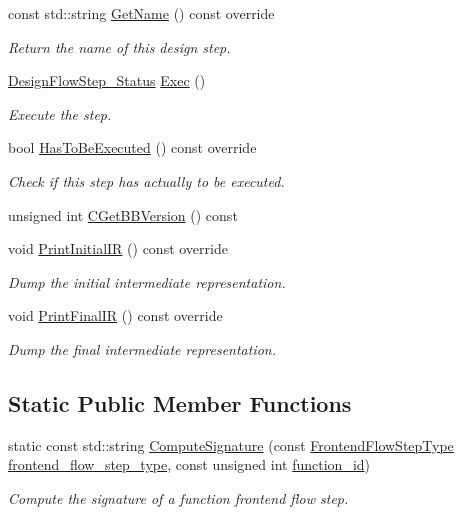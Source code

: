 \begin{DoxyCompactItemize}
const std\+::string \hyperlink{classFunctionFrontendFlowStep_add9013c4bc46fe7e932151ca5b902d32}{Get\+Name} () const override
\begin{DoxyCompactList}\small\item\em Return the name of this design step. \end{DoxyCompactList}\item 
\hyperlink{design__flow__step_8hpp_afb1f0d73069c26076b8d31dbc8ebecdf}{Design\+Flow\+Step\+\_\+\+Status} \hyperlink{classFunctionFrontendFlowStep_a4ee2aae4089ec112f2236c0b08a854bb}{Exec} ()
\begin{DoxyCompactList}\small\item\em Execute the step. \end{DoxyCompactList}\item 
bool \hyperlink{classFunctionFrontendFlowStep_a12e786363530aa9533e4bd9380130d75}{Has\+To\+Be\+Executed} () const override
\begin{DoxyCompactList}\small\item\em Check if this step has actually to be executed. \end{DoxyCompactList}\item 
unsigned int \hyperlink{classFunctionFrontendFlowStep_a3b2bc26e306ec1bb81f0c70b40632899}{C\+Get\+B\+B\+Version} () const
\item 
void \hyperlink{classFunctionFrontendFlowStep_a65cf8273a7a4f4bc3ed85c04220349ad}{Print\+Initial\+IR} () const override
\begin{DoxyCompactList}\small\item\em Dump the initial intermediate representation. \end{DoxyCompactList}\item 
void \hyperlink{classFunctionFrontendFlowStep_abe2dc98fddb94bebf12a91e8c78f9dcc}{Print\+Final\+IR} () const override
\begin{DoxyCompactList}\small\item\em Dump the final intermediate representation. \end{DoxyCompactList}\end{DoxyCompactItemize}
\subsection*{Static Public Member Functions}
\begin{DoxyCompactItemize}
\item 
static const std\+::string \hyperlink{classFunctionFrontendFlowStep_afb307a4196545afa53ce35c7e4955de7}{Compute\+Signature} (const \hyperlink{frontend__flow__step_8hpp_afeb3716c693d2b2e4ed3e6d04c3b63bb}{Frontend\+Flow\+Step\+Type} \hyperlink{classFrontendFlowStep_ad49067d6a17119d47316149ab757b60d}{frontend\+\_\+flow\+\_\+step\+\_\+type}, const unsigned int \hyperlink{classFunctionFrontendFlowStep_a58ef2383ad1a212a8d3f396625a4b616}{function\+\_\+id})
\begin{DoxyCompactList}\small\item\em Compute the signature of a function frontend flow step. \end{DoxyCompactList}\end{DoxyCompactItemize}
